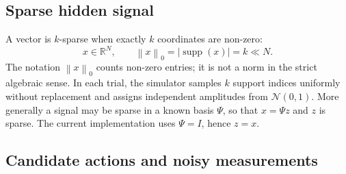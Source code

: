 \documentclass[11pt,a4paper]{article}
\newcommand{\R}{\mathbb{R}}
\newcommand{\supp}{\operatorname{supp}}
\newcommand{\norm}[1]{\left\lVert #1\right\rVert}
\begin{document}
\subsection{Sparse hidden signal}

A vector is $k$-sparse when exactly $k$ coordinates are non-zero:
\begin{equation}
x\in\R^N,
\qquad \norm{x}_0 = |\supp(x)| = k \ll N .
\label{eq:sparsity}
\end{equation}
The notation $\norm{x}_0$ counts non-zero entries; it is not a norm in the strict algebraic
sense.  In each trial, the simulator samples $k$ support indices uniformly without
replacement and assigns independent amplitudes from $\mathcal{N}(0,1)$.  More generally a
signal may be sparse in a known basis $\Psi$, so that $x=\Psi z$ and $z$ is sparse.  The
current implementation uses $\Psi=I$, hence $z=x$.

\subsection{Candidate actions and noisy measurements}
\end{document}
